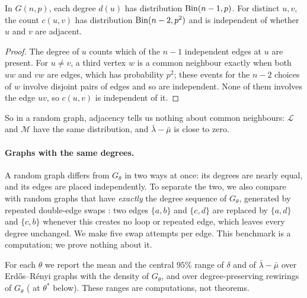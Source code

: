 \begin{proposition}\label{prop:er}
In $G(n,p)$, each degree $d(u)$ has distribution $\operatorname{Bin}(n-1,p)$. For distinct
$u,v$, the count $c(u,v)$ has distribution $\operatorname{Bin}(n-2,p^2)$ and is independent
of whether $u$ and $v$ are adjacent.
\end{proposition}

\begin{proof}
The degree of $u$ counts which of the $n-1$ independent edges at $u$ are
present. For $u\ne v$, a third vertex $w$ is a common neighbour exactly when
both $uw$ and $vw$ are edges, which has probability $p^2$; these events for the
$n-2$ choices of $w$ involve disjoint pairs of edges and so are independent.
None of them involves the edge $uv$, so $c(u,v)$ is independent of it.
\end{proof}

So in a random graph, adjacency tells us nothing about common neighbours:
$\mathcal L$ and $\mathcal M$ have the same distribution, and
$\bar\lambda-\bar\mu$ is close to zero.

\paragraph{Graphs with the same degrees.} A random graph differs from
$G_\theta$ in two ways at once: its degrees are nearly equal, and its edges
are placed independently. To separate the two, we also compare with random
graphs that have \emph{exactly} the degree sequence of $G_\theta$, generated by
repeated double-edge swaps \cite{maslov2002}: two edges $\{a,b\}$ and $\{c,d\}$
are replaced by $\{a,d\}$ and $\{c,b\}$ whenever this creates no loop or
repeated edge, which leaves every degree unchanged. We make five swap attempts
per edge. This benchmark is a computation; we prove nothing about it.

For each $\theta$ we report the mean and the central $95\%$ range of $\delta$
and of $\bar\lambda-\bar\mu$ over \NER{} Erd\H{o}s--R\'enyi graphs with the
density of $G_\theta$, and over \NDP{} degree-preserving rewirings of
$G_\theta$ (\NDPStar{} at $\theta^\ast$ below). These ranges are computations,
not theorems.

